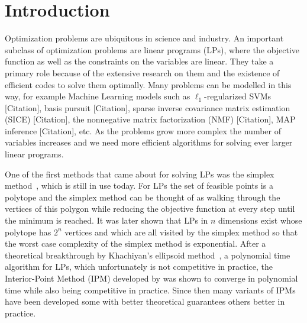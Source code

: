 \chapter{Introduction}\label{chap:introduction}

Optimization problems are ubiquitous in science and industry.
An important subclass of optimization problems are linear programs (LPs), where the objective function as well as the constraints on the variables are linear.
They take a primary role because of the extensive research on them and the existence of efficient codes to solve them optimally.
Many problems can be modelled in this way, for example Machine Learning models such as \(\ell_1\)-regularized SVMs [Citation], basis pursuit [Citation], sparse inverse covariance matrix estimation (SICE) [Citation], the nonnegative matrix factorization (NMF) [Citation], MAP inference [Citation], etc. %
As the problems grow more complex the number of variables increases and we need more efficient algorithms for solving ever larger linear programs.

One of the first methods that came about for solving LPs was the simplex method~\cite{Dantzig-Simplex}, which is still in use today.
For LPs the set of feasible points is a polytope and the simplex method can be thought of as walking through the vertices of this polygon while reducing the objective function at every step until the minimum is reached.
It was later shown that LPs in \(n\) dimensions exist whose polytope has \(2^n\) vertices and which are all visited by the simplex method so that the worst case complexity of the simplex method is exponential.
After a theoretical breakthrough by Khachiyan's ellipsoid method~\cite{Khachiyan-Ellipsoid1,Khachiyan-Ellipsoid2}, a polynomial time algorithm for LPs, which unfortunately is not competitive in practice, the Interior-Point Method (IPM) developed by \textcite{Karmarkar-IPM} was shown to converge in polynomial time while also being competitive in practice.
Since then many variants of IPMs have been developed some with better theoretical guarantees others better in practice.

